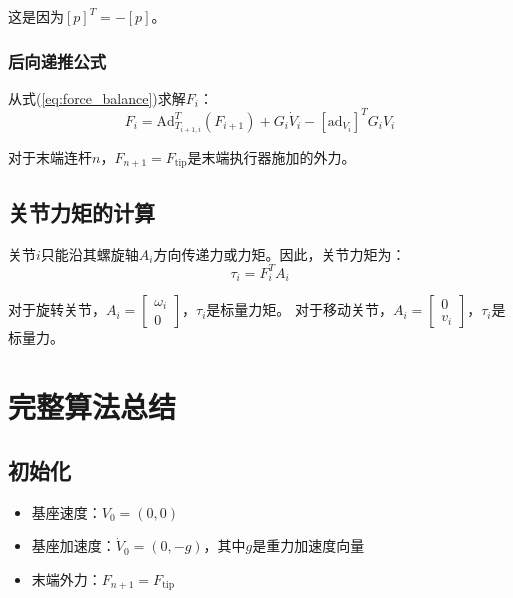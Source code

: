 \documentclass[12pt,a4paper]{article}
\begin{document}
    这是因为$[p]^T = -[p]$。
    
    \subsubsection{后向递推公式}
    
    从式(\ref{eq:force_balance})求解$F_i$：
    \begin{equation}
    F_i = \text{Ad}_{T_{i+1,i}}^T(F_{i+1}) + G_i \dot{V}_i - [\text{ad}_{V_i}]^T G_i V_i
    \label{eq:backward_recursive}
    \end{equation}
    
    对于末端连杆$n$，$F_{n+1} = F_{\text{tip}}$是末端执行器施加的外力。
    
    \subsection{关节力矩的计算}
    
    关节$i$只能沿其螺旋轴$A_i$方向传递力或力矩。因此，关节力矩为：
    \begin{equation}
    \tau_i = F_i^T A_i
    \label{eq:joint_torque}
    \end{equation}
    
    对于旋转关节，$A_i = \begin{bmatrix} \omega_i \\ 0 \end{bmatrix}$，$\tau_i$是标量力矩。
    对于移动关节，$A_i = \begin{bmatrix} 0 \\ v_i \end{bmatrix}$，$\tau_i$是标量力。
    
    \section{完整算法总结}
    
    \subsection{初始化}
    
    \begin{itemize}
    \item 基座速度：$V_0 = (0, 0)$
    \item 基座加速度：$\dot{V}_0 = (0, -g)$，其中$g$是重力加速度向量
    \item 末端外力：$F_{n+1} = F_{\text{tip}}$
    \end{itemize}
    
\end{document}

